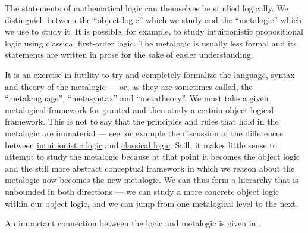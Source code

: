 \begin{remark}\label{rem:metalogic}
  The statements of mathematical logic can themselves be studied logically. We distinguish between the \enquote{object logic} which we study and the \enquote{metalogic} which we use to study it. It is possible, for example, to study intuitionistic propositional logic using classical first-order logic. The metalogic is usually less formal and its statements are written in prose for the sake of easier understanding.

  It is an exercise in futility to try and completely formalize the language, syntax and theory of the metalogic --- or, as they are sometimes called, the \enquote{metalanguage}, \enquote{metasyntax} and \enquote{metatheory}. We must take a given metalogical framework for granted and then study a certain object logical framework. This is not to say that the principles and rules that hold in the metalogic are immaterial --- see for example the discussion of the differences between \hyperref[rem:intuitionistic_logic]{intuitionistic logic} and \hyperref[rem:classical_logic]{classical logic}. Still, it makes little sense to attempt to study the metalogic because at that point it becomes the object logic and the still more abstract conceptual framework in which we reason about the metalogic now becomes the new metalogic. We can thus form a hierarchy that is unbounded in both directions --- we can study a more concrete object logic within our object logic, and we can jump from one metalogical level to the next.

  An important connection between the logic and metalogic is given in .
\end{remark}

